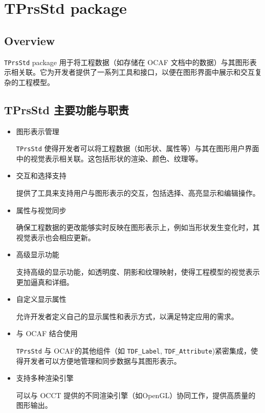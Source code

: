 \documentclass[11pt]{article}
\begin{document}
\section{TPrsStd package}
\label{sec:orgabf9f64}

\subsection{Overview}
\label{sec:org01b67ae}

\texttt{TPrsStd} package 用于将工程数据（如存储在 OCAF 文档中的数据）与其图形表示相关联。它为开发者提供了一系列工具和接口，以便在图形界面中展示和交互复杂的工程模型。
\subsection{TPrsStd 主要功能与职责}
\label{sec:orgd2c40df}

\begin{itemize}
\item 图形表示管理

\texttt{TPrsStd} 使得开发者可以将工程数据（如形状、属性等）与其在图形用户界面中的视觉表示相关联。这包括形状的渲染、颜色、纹理等。

\item 交互和选择支持

提供了工具来支持用户与图形表示的交互，包括选择、高亮显示和编辑操作。

\item 属性与视觉同步

确保工程数据的更改能够实时反映在图形表示上，例如当形状发生变化时，其视觉表示也会相应更新。

\item 高级显示功能

支持高级的显示功能，如透明度、阴影和纹理映射，使得工程模型的视觉表示更加逼真和详细。

\item 自定义显示属性

允许开发者定义自己的显示属性和表示方式，以满足特定应用的需求。

\item 与 OCAF 结合使用

\texttt{TPrsStd} 与 OCAF的其他组件（如 \texttt{TDF\_Label}, \texttt{TDF\_Attribute})紧密集成，使得开发者可以方便地管理和同步数据与其图形表示。

\item 支持多种渲染引擎

可以与 OCCT 提供的不同渲染引擎（如OpenGL）协同工作，提供高质量的图形输出。
\end{itemize}
\end{document}
